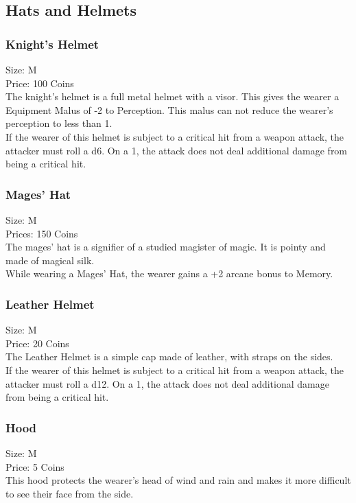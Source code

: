\subsection{Hats and Helmets}\label{subsec:helmets}

\subsubsection{Knight's Helmet}\label{item:knightHelment}
Size: M\\
Price: 100 Coins\\
The knight's helmet is a full metal helmet with a visor.
This gives the wearer a Equipment Malus of -2 to Perception.
This malus can not reduce the wearer's perception to less than 1.\\
If the wearer of this helmet is subject to a critical hit from a weapon attack, the attacker must roll a d6.
On a 1, the attack does not deal additional damage from being a critical hit.\\

\subsubsection{Mages' Hat}\label{item:mageHat}
Size: M\\
Prices: 150 Coins\\
The mages' hat is a signifier of a studied magister of magic.
It is pointy and made of magical silk.\\
While wearing a Mages' Hat, the wearer gains a +2 arcane bonus to Memory.\\

\subsubsection{Leather Helmet}\label{item:leatherHelmet}
Size: M\\
Price: 20 Coins\\
The Leather Helmet is a simple cap made of leather, with straps on the sides.\\
If the wearer of this helmet is subject to a critical hit from a weapon attack, the attacker must roll a d12.
On a 1, the attack does not deal additional damage from being a critical hit.\\

\subsubsection{Hood}\label{item:hood}
Size: M\\
Price: 5 Coins\\
This hood protects the wearer's head of wind and rain and makes it more difficult to see their face from the side.\\

